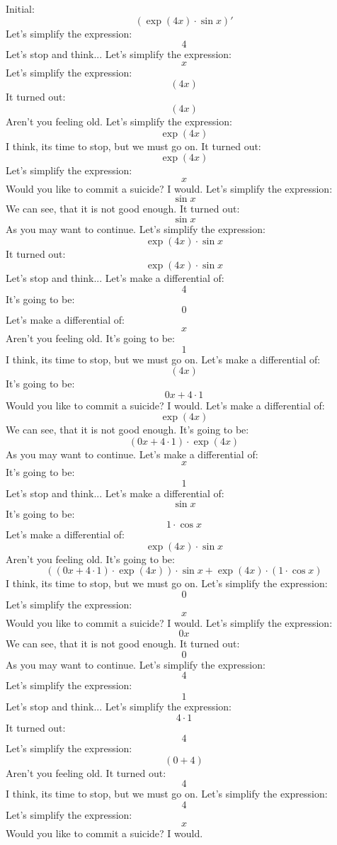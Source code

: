 \documentclass[12pt,a4paper]{scrartcl}
\begin{document}
            $$
$$Initial:$$ \left( \exp{  \left( 4x \right)  }  \cdot  \sin x\right)'$$  
Let's simplify the expression: $$4$$ Let's stop and think... 
Let's simplify the expression: $$x$$  
Let's simplify the expression: $$ \left( 4x \right) $$  
It turned out: $$ \left( 4x \right) $$ Aren't you feeling old. 
Let's simplify the expression: $$ \exp{  \left( 4x \right)  } $$ I think, its time to stop, but we must go on. 
It turned out: $$ \exp{  \left( 4x \right)  } $$  
Let's simplify the expression: $$x$$ Would you like to commit a suicide? I would. 
Let's simplify the expression: $$ \sin x$$ We can see, that it is not good enough. 
It turned out: $$ \sin x$$ As you may want to continue. 
Let's simplify the expression: $$ \exp{  \left( 4x \right)  }  \cdot  \sin x$$  
It turned out: $$ \exp{  \left( 4x \right)  }  \cdot  \sin x$$ Let's stop and think... 
Let's make a differential of: $$4$$  
It's going to be: $$0$$  
Let's make a differential of: $$x$$ Aren't you feeling old. 
It's going to be: $$1$$ I think, its time to stop, but we must go on. 
Let's make a differential of: $$ \left( 4x \right) $$  
It's going to be: $$0x+4 \cdot 1$$ Would you like to commit a suicide? I would. 
Let's make a differential of: $$ \exp{  \left( 4x \right)  } $$ We can see, that it is not good enough. 
It's going to be: $$ \left( 0x+4 \cdot 1 \right)  \cdot  \exp{  \left( 4x \right)  } $$ As you may want to continue. 
Let's make a differential of: $$x$$  
It's going to be: $$1$$ Let's stop and think... 
Let's make a differential of: $$ \sin x$$  
It's going to be: $$1 \cdot  \cos x$$  
Let's make a differential of: $$ \exp{  \left( 4x \right)  }  \cdot  \sin x$$ Aren't you feeling old. 
It's going to be: $$ \left(  \left( 0x+4 \cdot 1 \right)  \cdot  \exp{  \left( 4x \right)  }  \right)  \cdot  \sin x+ \exp{  \left( 4x \right)  }  \cdot  \left( 1 \cdot  \cos x \right) $$ I think, its time to stop, but we must go on. 
Let's simplify the expression: $$0$$  
Let's simplify the expression: $$x$$ Would you like to commit a suicide? I would. 
Let's simplify the expression: $$0x$$ We can see, that it is not good enough. 
It turned out: $$0$$ As you may want to continue. 
Let's simplify the expression: $$4$$  
Let's simplify the expression: $$1$$ Let's stop and think... 
Let's simplify the expression: $$4 \cdot 1$$  
It turned out: $$4$$  
Let's simplify the expression: $$ \left( 0+4 \right) $$ Aren't you feeling old. 
It turned out: $$4$$ I think, its time to stop, but we must go on. 
Let's simplify the expression: $$4$$  
Let's simplify the expression: $$x$$ Would you like to commit a suicide? I would. 
\end{document}
